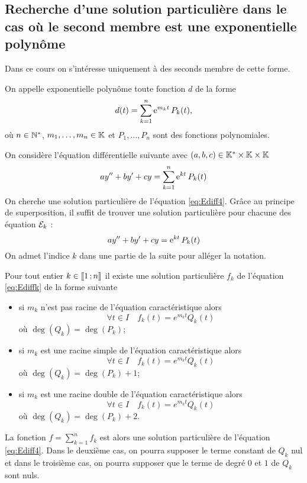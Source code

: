 \subsection{Recherche d'une solution particulière dans le cas où le second membre est une \og exponentielle polynôme \fg}
\label{subsec:recherchesolutionpartexppol}
Dans ce cours on s'intéresse uniquement à des seconds membre de cette forme.
\begin{defdef}
  On appelle exponentielle polynôme toute fonction $d$ de la forme
  \begin{equation}
    d(t)=\sum_{k=1}^{n} \operatorname{e}^{m_k t} P_k (t),
  \end{equation}
où $n \in \mathbb{N}^*$, $m_1, \ldots, m_n \in \mathbb{K}$ et $ P_1, \ldots, P_n$ sont des fonctions polynomiales. 
\end{defdef}
On considère l'équation différentielle  suivante avec $(a,b,c) \in \mathbb{K}^{*}\times\mathbb{K}\times\mathbb{K}$
\begin{equation}
  \label{eq:Ediff4}
  ay''+by'+cy=\sum_{k=1}^{n} \operatorname{e}^{kt} P_k(t)
\end{equation}
On cherche une solution particulière de l'équation \eqref{eq:Ediff4}. Grâce au principe de superposition, il suffit de trouver une solution particulière pour chacune des équation $\mathcal{E}_k$ : 
\begin{equation}
  \label{eq:Ediffk}
  ay''+by'+cy= \operatorname{e}^{kt} P_k(t)
\end{equation}
On admet l'indice $k$ dans une partie de la suite pour alléger la notation.
\begin{theo}
  Pour tout entier $k \in \mathopen{\llbracket}1\mathclose{}\mathpunct{};n\mathclose{\rrbracket}$ il existe une solution particulière $f_k$ de l'équation \eqref{eq:Ediffk} de la forme suivante
  \begin{itemize}
  \item si $m_k$ n'est pas racine de l'équation caractéristique alors
    \begin{equation}
      \forall t \in I \quad f_k(t)=e^{m_k t} Q_k(t)
    \end{equation}
    où $\deg(Q_k)=\deg(P_k)$;
  \item si $m_k$ est une racine simple de l'équation caractéristique alors 
    \begin{equation}
      \forall t \in I \quad f_k(t)=e^{m_k t} Q_k(t)
    \end{equation}
    où $\deg(Q_k)=\deg(P_k)+1$;
  \item si $m_k$ est une racine double de l'équation caractéristique alors 
    \begin{equation}
      \forall t \in I \quad f_k(t)=e^{m_k t} Q_k(t)
    \end{equation}
    où $\deg(Q_k)=\deg(P_k)+2$.
  \end{itemize}
La fonction $f=\sum_{k=1}^{n} f_k$ est alors une solution particulière de l'équation \eqref{eq:Ediff4}. Dans le deuxième cas, on pourra supposer le terme constant de $Q_k$ nul et dans le troisième cas, on pourra supposer que le terme de degré $0$ et $1$ de $Q_k$ sont nuls.
\end{theo}
